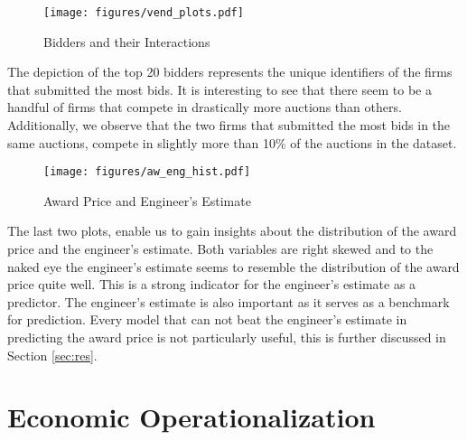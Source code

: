 \documentclass[a4paper,12pt, headsepline]{scrartcl}
\numberwithin{equation}{section}
\begin{document}
\begin{figure}[H]
	\texttt{[image: figures/vend\_plots.pdf]}
	\caption{Bidders and their Interactions}\label{fig:vendplots}
\end{figure}

The depiction of the top 20 bidders represents the unique identifiers of the firms that submitted the most bids. It is interesting to see that there seem to be a handful of firms that compete in drastically more auctions than others. Additionally, we observe that the two firms that submitted the most bids in the same auctions, compete in slightly more than 10\% of the auctions in the dataset.

\begin{figure}[H]
	\texttt{[image: figures/aw\_eng\_hist.pdf]}
	\caption{Award Price and Engineer's Estimate}\label{fig:aweng}
\end{figure}

The last two plots, enable us to gain insights about the distribution of the award price and the engineer's estimate. Both variables are right skewed and to the naked eye the engineer's estimate seems to resemble the distribution of the award price quite well. This is a strong indicator for the engineer's estimate as a predictor. The engineer's estimate is also important as it serves as a benchmark for prediction. Every model that can not beat the engineer's estimate in predicting the award price is not particularly useful, this is further discussed in Section \ref{sec:res}.\\
\newpage
\section{Economic Operationalization}\label{sec:op}
\end{document}
